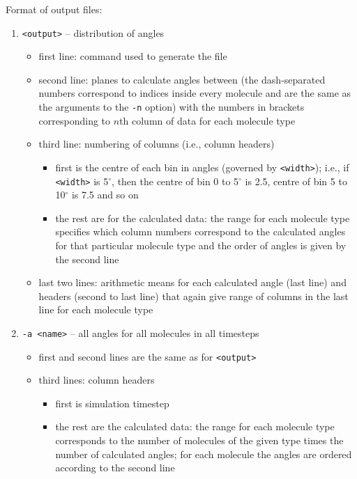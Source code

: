 \noindent
Format of output files:
\begin{enumerate}[nosep,leftmargin=20pt]
  \item \texttt{<output>} -- distribution of angles
    \begin{itemize}[nosep,leftmargin=5pt]
      \item first line: command used to generate the file
      \item second line: planes to calculate angles between (the
        dash-separated numbers correspond to indices inside every molecule
        and are the same as the arguments to the \texttt{-n} option) with
        the numbers in brackets corresponding to $n$th column of data for
        each molecule type
      \item third line: numbering of columns (i.e., column headers)
        \begin{itemize}[nosep,leftmargin=10pt]
          \item first is the centre of each bin in angles (governed by
            \texttt{<width>}); i.e., if \texttt{<width>} is 5$^{\circ}$,
            then the centre of bin 0 to 5$^{\circ}$ is 2.5, centre of bin 5
            to 10$^{\circ}$ is 7.5 and so on
          \item the rest are for the calculated data: the range for each
            molecule type specifies which column numbers correspond to the
            calculated angles for that particular molecule type and the
            order of angles is given by the second line
        \end{itemize}
      \item last two lines: arithmetic means for each calculated angle
        (last line) and headers (second to last line) that again give range
        of columns in the last line for each molecule type
    \end{itemize}
  \item \texttt{-a <name>} -- all angles for all molecules in all timesteps
  \begin{itemize}[nosep,leftmargin=5pt]
    \item first and second lines are the same as for \texttt{<output>}
    \item third lines: column headers
      \begin{itemize}[nosep,leftmargin=10pt]
        \item first is simulation timestep
        \item the rest are the calculated data: the range for each molecule
          type corresponds to the number of molecules of the given type
          times the number of calculated angles; for each molecule the
          angles are ordered according to the second line
      \end{itemize}
  \end{itemize}
\end{enumerate}
